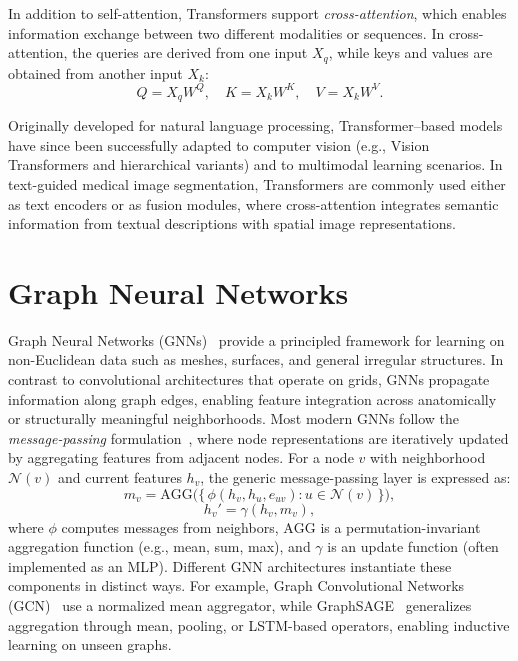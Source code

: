 \documentclass[FCD_GNN.tex]{subfiles}
\begin{document}
In addition to self-attention, Transformers support \emph{cross-attention},
which enables information exchange between two different modalities or sequences.
In cross-attention, the queries are derived from one input $X_q$,
while keys and values are obtained from another input $X_k$:
\begin{equation}
Q = X_q W^{Q}, \quad
K = X_k W^{K}, \quad
V = X_k W^{V}.
\label{eq:cross_attention}
\end{equation}

Originally developed for natural language processing,
Transformer--based models have since been successfully adapted to computer vision
(e.g., Vision Transformers and hierarchical variants)
and to multimodal learning scenarios.
In text-guided medical image segmentation,
Transformers are commonly used either as text encoders or as fusion modules,
where cross-attention integrates semantic information from textual descriptions
with spatial image representations.

\section{Graph Neural Networks}
Graph Neural Networks (GNNs)~\cite{Scarselli2008GNN} provide a principled framework for learning on
non-Euclidean data such as meshes, surfaces, and general irregular structures.
In contrast to convolutional architectures that operate on grids, GNNs propagate
information along graph edges, enabling feature integration across anatomically
or structurally meaningful neighborhoods. Most modern GNNs follow the 
\textit{message-passing} formulation~\cite{Gilmer2017MessagePassing}, where node 
representations are iteratively updated by aggregating features from adjacent 
nodes. For a node $v$ with neighborhood $\mathcal{N}(v)$ and current features 
$h_v$, the generic message-passing layer is expressed as:
\begin{equation}
    m_v = \mathrm{AGG}\bigl(\{\, \phi(h_v, h_u, e_{uv}) 
    : u \in \mathcal{N}(v) \,\}\bigr),
\end{equation}
\begin{equation}
    h_v' = \gamma(h_v, m_v),
\end{equation}
where $\phi$ computes messages from neighbors, 
$\mathrm{AGG}$ is a permutation-invariant aggregation function 
(e.g., mean, sum, max), and $\gamma$ is an update function 
(often implemented as an MLP). 
Different GNN architectures instantiate these components in distinct ways. 
For example, Graph Convolutional Networks (GCN)~\cite{Kipf2017GCN} use a 
normalized mean aggregator,
while GraphSAGE~\cite{Hamilton2017GraphSAGE} generalizes aggregation through 
mean, pooling, or LSTM-based operators, enabling inductive learning on unseen 
graphs.
\end{document}
